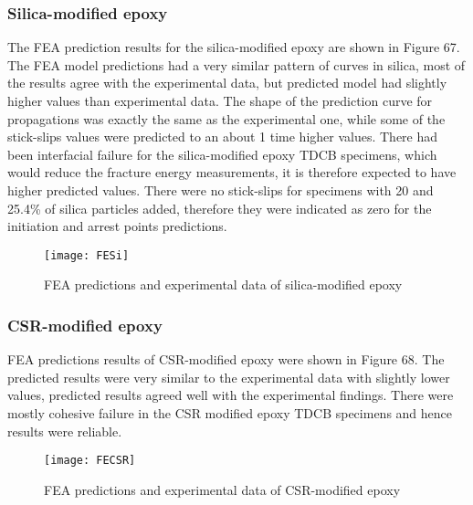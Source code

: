\documentclass[numbers=noendperiod,chapterprefix=on]{icldt} %
\begin{document}
\subsubsection{Silica-modified epoxy}
The FEA prediction results for the silica-modified epoxy are shown in Figure 67. The FEA model predictions had a very similar pattern of curves in silica, most of the results agree with the experimental data, but predicted model had slightly higher values than experimental data. The shape of the prediction curve for propagations was exactly the same as the experimental one, while some of the stick-slips values were predicted to an about 1 time higher values. There had been interfacial failure for the silica-modified epoxy TDCB specimens, which would reduce the fracture energy measurements, it is therefore expected to have higher predicted values. There were no stick-slips for specimens with 20 and 25.4\% of silica particles added, therefore they were indicated as zero for the initiation and arrest points predictions. 

\begin{figure}[!hp]
\centering
\texttt{[image: FESi]}
\caption{FEA predictions and experimental data of silica-modified epoxy }
\end{figure}
\FloatBarrier

\subsubsection{CSR-modified epoxy}
FEA predictions results of CSR-modified epoxy were shown in Figure 68. The predicted results were very similar to the experimental data with slightly lower values, predicted results agreed well with the experimental findings. There were mostly cohesive failure in the CSR modified epoxy TDCB specimens and hence results were reliable. 

\begin{figure}[!hp]
\centering
\texttt{[image: FECSR]}
\caption{FEA predictions and experimental data of CSR-modified epoxy }
\end{figure}
\FloatBarrier
\end{document}
